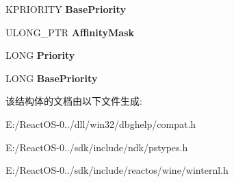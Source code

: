 \begin{DoxyCompactItemize}
K\+P\+R\+I\+O\+R\+I\+TY {\bfseries Base\+Priority}
\item 
\mbox{\label{struct___t_h_r_e_a_d___b_a_s_i_c___i_n_f_o_r_m_a_t_i_o_n_a94b99c071279ff64f318f7f916e848db}} 
U\+L\+O\+N\+G\+\_\+\+P\+TR {\bfseries Affinity\+Mask}
\item 
\mbox{\label{struct___t_h_r_e_a_d___b_a_s_i_c___i_n_f_o_r_m_a_t_i_o_n_a6d2772a0d72d260400205937e8ea62f3}} 
L\+O\+NG {\bfseries Priority}
\item 
\mbox{\label{struct___t_h_r_e_a_d___b_a_s_i_c___i_n_f_o_r_m_a_t_i_o_n_a8d0bd40f8bfc377f1662a075a7fd2721}} 
L\+O\+NG {\bfseries Base\+Priority}
\end{DoxyCompactItemize}


该结构体的文档由以下文件生成\+:\begin{DoxyCompactItemize}
\item 
E\+:/\+React\+O\+S-\/0../dll/win32/dbghelp/compat.\+h\item 
E\+:/\+React\+O\+S-\/0../sdk/include/ndk/pstypes.\+h\item 
E\+:/\+React\+O\+S-\/0../sdk/include/reactos/wine/winternl.\+h\end{DoxyCompactItemize}
